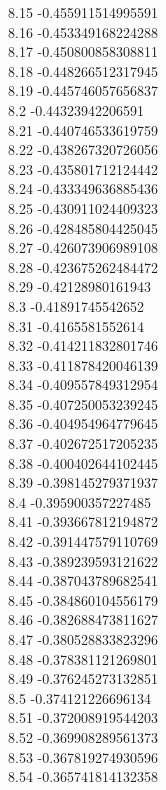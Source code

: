 {8.15	-0.455911514995591\\
8.16	-0.453349168224288\\
8.17	-0.450800858308811\\
8.18	-0.448266512317945\\
8.19	-0.445746057656837\\
8.2	-0.44323942206591\\
8.21	-0.440746533619759\\
8.22	-0.438267320726056\\
8.23	-0.435801712124442\\
8.24	-0.433349636885436\\
8.25	-0.430911024409323\\
8.26	-0.428485804425045\\
8.27	-0.426073906989108\\
8.28	-0.423675262484472\\
8.29	-0.42128980161943\\
8.3	-0.41891745542652\\
8.31	-0.4165581552614\\
8.32	-0.414211832801746\\
8.33	-0.411878420046139\\
8.34	-0.409557849312954\\
8.35	-0.407250053239245\\
8.36	-0.404954964779645\\
8.37	-0.402672517205235\\
8.38	-0.400402644102445\\
8.39	-0.398145279371937\\
8.4	-0.395900357227485\\
8.41	-0.393667812194872\\
8.42	-0.391447579110769\\
8.43	-0.389239593121622\\
8.44	-0.387043789682541\\
8.45	-0.384860104556179\\
8.46	-0.382688473811627\\
8.47	-0.380528833823296\\
8.48	-0.378381121269801\\
8.49	-0.376245273132851\\
8.5	-0.374121226696134\\
8.51	-0.372008919544203\\
8.52	-0.369908289561373\\
8.53	-0.367819274930596\\
8.54	-0.365741814132358\\
}

